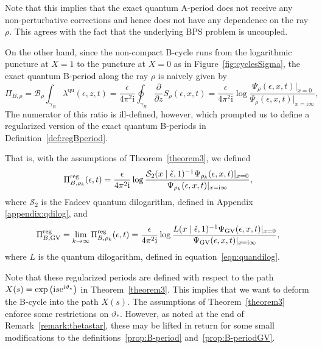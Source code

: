 \documentclass[pdftex]{sigma}
\numberwithin{equation}{section}
\begin{document}
Note that this implies that the exact quantum A-period does not receive any non-perturbative corrections and hence does not have any dependence on the ray $\rho$. This agrees with the fact that the underlying BPS problem is uncoupled.

On the other hand, since the non-compact B-cycle runs from the logarithmic puncture at $X=1$ to the puncture at $X=0$ as in Figure~\ref{fig:cyclesSigma}, the exact quantum B-period along the ray $\rho$ is naively given by
\begin{equation*}
\Pi_{B,\rho} = \mathcal{B}_\rho \int_{\gamma_B} \lambda^{\mathrm{qu}}(\epsilon,z,t) = \frac{ \epsilon} {4 \pi^2 \mathrm{i}} \oint_{\gamma_B} \frac{\partial}{\partial z} S_\rho(\epsilon,x,t)
= \frac{ \epsilon} {4 \pi^2 \mathrm{i}} \log \frac{\Psi_\rho(\epsilon,x,t)|_{x=0}}{\Psi_\rho(\epsilon,x,t)|_{x=\mathrm{i}\infty}},
\end{equation*}
The numerator of this ratio is ill-defined, however, which prompted us to define a regularized version of the exact quantum B-periods in Definition~\ref{def:regBperiod}.

That is, with the assumptions of Theorem~\ref{theorem3}, we defined
\begin{equation}\label{prop:B-period}
\Pi_{B,\rho_k}^{\rm reg}(\epsilon,t) = \frac{ \epsilon} {4 \pi^2 \mathrm{i}} \log \frac{\mathcal{S}_2(x\mid \check\epsilon,1)^{-1} \Psi_{\rho_k}(\epsilon,x,t)|_{x=0}}{\Psi_{\rho_k}(\epsilon,x,t)|_{x=\mathrm{i}\infty}},
\end{equation}
where $\mathcal{S}_2$ is the Fadeev quantum dilogarithm, defined in Appendix \ref{appendix:qdilog}, and
\begin{equation}\label{prop:B-periodGV}
\Pi_{B,\mathrm{GV}}^{\rm reg} = \lim_{k \to \infty} \Pi_{B,\rho_k}^{\rm reg}(\epsilon,t) = \frac{ \epsilon} {4 \pi^2 \mathrm{i}} \log \frac{L(x\mid \check\epsilon,1)^{-1} \Psi_{\mathrm{GV}}(\epsilon,x,t)|_{x=0}}{\Psi_{\mathrm{GV}}(\epsilon,x,t)|_{x=\mathrm{i}\infty}},
\end{equation}
where $L$ is the quantum dilogarithm, defined in equation~\eqref{eqn:quandilog}.

Note that these regularized periods are defined with respect to the path $X(s)= \exp \big(\mathrm{i} s {\rm e}^{\mathrm{i} \vartheta_*} \big)$ in Theorem~\ref{theorem3}. This implies that we want to deform the B-cycle into the path $X(s)$. The assumptions of Theorem~\ref{theorem3} enforce some restrictions on $\vartheta_*$. However, as noted at the end of Remark~\ref{remark:thetastar}, these may be lifted in return for some small modifications to the definitions~\eqref{prop:B-period} and~\eqref{prop:B-periodGV}.
\end{document}
